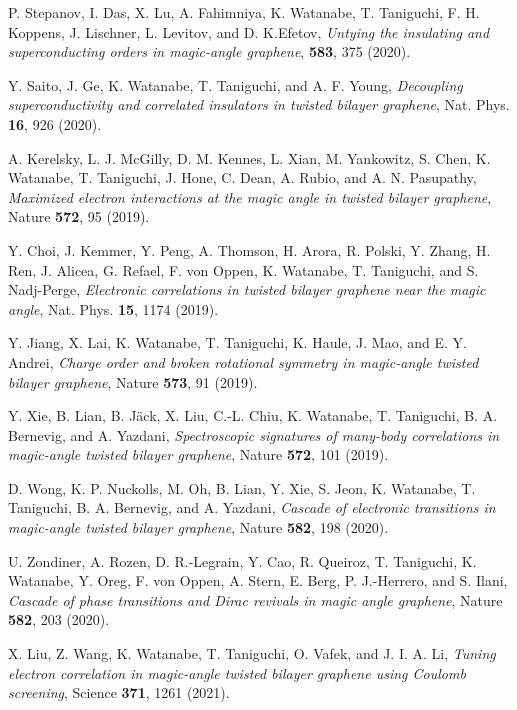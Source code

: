 \documentclass[aps,prb,amsmath,amssymb,floatfix,twocolumn]{revtex4}
\begin{document}
\begin{thebibliography}{}
 P. Stepanov, I. Das, X. Lu, A. Fahimniya, K. Watanabe, T. Taniguchi, F. H. Koppens, J. Lischner, L. Levitov, and D. K.Efetov, \emph{Untying the insulating and superconducting orders in magic-angle graphene}, \textbf{583}, 375 (2020).

 Y. Saito, J. Ge, K. Watanabe, T. Taniguchi, and A. F. Young, \emph{Decoupling superconductivity and correlated insulators in twisted bilayer graphene}, Nat. Phys. \textbf{16}, 926 (2020).

 A. Kerelsky, L. J. McGilly, D. M. Kennes, L. Xian, M. Yankowitz, S. Chen, K. Watanabe, T. Taniguchi, J. Hone, C. Dean, A. Rubio, and A. N. Pasupathy, \emph{Maximized electron interactions at the magic angle in twisted bilayer graphene}, Nature \textbf{572}, 95 (2019).

 Y. Choi, J. Kemmer, Y. Peng, A. Thomson, H. Arora, R. Polski, Y. Zhang, H. Ren, J. Alicea, G. Refael, F. von Oppen, K. Watanabe, T. Taniguchi, and  S. Nadj-Perge,  \emph{Electronic correlations in twisted bilayer graphene near the magic angle}, Nat. Phys. \textbf{15}, 1174 (2019).

 Y. Jiang, X. Lai, K. Watanabe, T. Taniguchi, K. Haule, J. Mao, and E. Y. Andrei, \emph{Charge order and broken rotational symmetry in magic-angle twisted bilayer graphene}, Nature \textbf{573}, 91 (2019).

 Y. Xie, B. Lian, B. Jäck, X. Liu, C.-L. Chiu, K. Watanabe, T. Taniguchi, B. A. Bernevig, and A. Yazdani, \emph{Spectroscopic signatures of many-body correlations in magic-angle twisted bilayer graphene}, Nature \textbf{572}, 101 (2019).

 D. Wong, K. P. Nuckolls, M. Oh, B. Lian, Y. Xie, S. Jeon, K. Watanabe, T. Taniguchi, B. A. Bernevig, and A. Yazdani, \emph{Cascade of electronic transitions in magic-angle twisted bilayer graphene}, Nature \textbf{582}, 198 (2020).

 U. Zondiner, A. Rozen, D. R.-Legrain, Y. Cao, R. Queiroz, T. Taniguchi, K. Watanabe, Y. Oreg, F. von Oppen, A. Stern, E. Berg, P. J.-Herrero, and S. Ilani, \emph{Cascade of phase transitions and Dirac revivals in magic angle graphene}, Nature \textbf{582}, 203 (2020).

 X. Liu, Z. Wang, K. Watanabe, T. Taniguchi, O. Vafek, and J. I. A. Li, \emph{Tuning electron correlation in magic-angle twisted bilayer graphene using Coulomb screening}, Science \textbf{371}, 1261 (2021).


\end{thebibliography}
\end{document}
